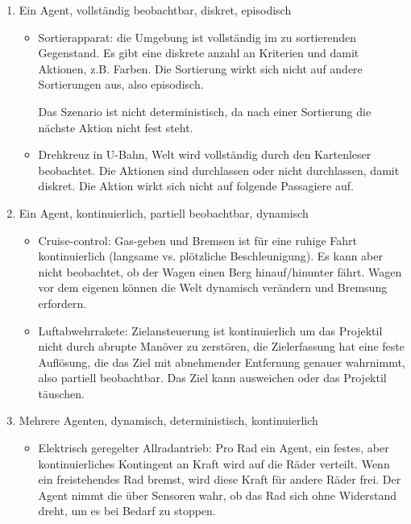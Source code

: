 \begin{enumerate}[label=\alph*)]
	\item Ein Agent, vollständig beobachtbar, diskret, episodisch
	\begin{itemize}
		\item Sortierapparat: die Umgebung ist vollständig im zu sortierenden Gegenstand. Es gibt eine diskrete anzahl an Kriterien und damit Aktionen, z.B. Farben. Die Sortierung wirkt sich nicht auf andere Sortierungen aus, also episodisch.
		
		Das Szenario ist nicht deterministisch, da nach einer Sortierung die nächste Aktion nicht fest steht.
		
		\item Drehkreuz in U-Bahn, Welt wird vollständig durch den Kartenleser beobachtet. Die Aktionen sind durchlassen oder nicht durchlassen, damit diskret. Die Aktion wirkt sich nicht auf folgende Passagiere auf.
	\end{itemize}
	
	\item Ein Agent, kontinuierlich, partiell beobachtbar, dynamisch
	\begin{itemize}
		\item Cruise-control: Gas-geben und Bremsen ist für eine ruhige Fahrt kontinuierlich (langsame vs. plötzliche Beschleunigung). Es kann aber nicht beobachtet, ob der Wagen einen Berg hinauf/hinunter fährt. Wagen vor dem eigenen können die Welt dynamisch verändern und Bremsung erfordern.
		
		\item Luftabwehrrakete: Zielansteuerung ist kontinuierlich um das Projektil nicht durch abrupte Manöver zu zerstören, die Zielerfassung hat eine feste Auflösung, die das Ziel mit abnehmender Entfernung genauer wahrnimmt, also partiell beobachtbar. Das Ziel kann ausweichen oder das Projektil täuschen.
	\end{itemize}
	
	\item Mehrere Agenten, dynamisch, deterministisch, kontinuierlich
	\begin{itemize}
		\item Elektrisch geregelter Allradantrieb: Pro Rad ein Agent, ein festes, aber kontinuierliches Kontingent an Kraft wird auf die Räder verteilt. Wenn ein freistehendes Rad bremst, wird diese Kraft für andere Räder frei. Der Agent nimmt die über Sensoren wahr, ob das Rad sich ohne Widerstand dreht, um es bei Bedarf zu stoppen.
		

\end{itemize}
\end{enumerate}
